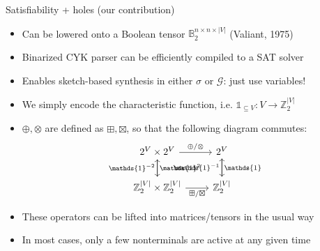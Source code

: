 \documentclass{beamer}
\begin{document}
\begin{frame}[fragile]{Satisfiability + holes (our contribution)}
  \begin{itemize}
    \item Can be lowered onto a Boolean tensor $\mathbb{B}_2^{n\times n \times |V|}$ (Valiant, 1975)
    \item Binarized CYK parser can be efficiently compiled to a SAT solver
    \item Enables sketch-based synthesis in either $\sigma$ or $\mathcal G$: just use variables!
    \item We simply encode the characteristic function, i.e. $\mathds{1}_{\subseteq V}: V\rightarrow \mathbb{Z}_2^{|V|}$
    \item $\oplus, \otimes$ are defined as $\boxplus, \boxtimes$, so that the following diagram commutes:
    \[\begin{tikzcd}
        2^V \times 2^V \arrow[r, "\oplus/\otimes"] \arrow[d, "\mathds{1}^2"]
        & 2^V \arrow[d, "\mathds{1}\phantom{^{-1}}"] \\
        \mathbb{Z}_2^{|V|} \times \mathbb{Z}_2^{|V|} \arrow[r, "\boxplus/\boxtimes", labels=below] \arrow[u, "\mathds{1}^{-2}"]
        & \mathbb{Z}_2^{|V|} \arrow[u, "\mathds{1}^{-1}"]
    \end{tikzcd}\]
    \item These operators can be lifted into matrices/tensors in the usual way
    \item In most cases, only a few nonterminals are active at any given time
  \end{itemize}
\end{frame}
\end{document}
